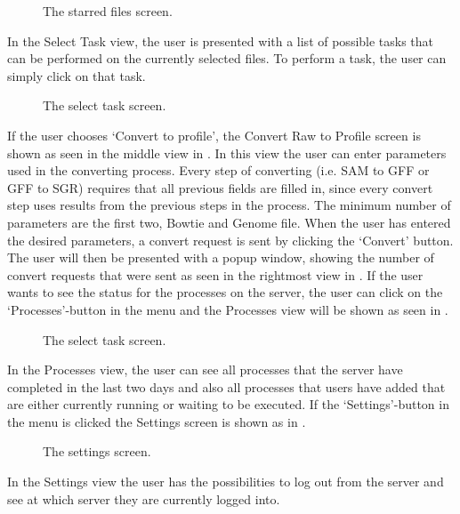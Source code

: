\begin{figure}[htb]
\caption{The starred files screen.}
\label{fig:ios_selectedFiles}
\end{figure}
\FloatBarrier
In the Select Task view, the user is presented with a list of possible tasks that can be performed on the currently selected files. To perform a task, the user can simply click on that task.

\begin{figure}[htb]
\caption{The select task screen.}
\label{fig:ios_convert}
\end{figure}
\FloatBarrier
If the user chooses ‘Convert to profile’, the Convert Raw to Profile screen is shown as seen in the middle view in . In this view the user can enter parameters used in the converting process. Every step of converting (i.e. SAM to GFF or GFF to SGR) requires that all previous fields are filled in, since every convert step uses results from the previous steps in the process. The minimum number of parameters are the first two, Bowtie and Genome file. When the user has entered the desired parameters, a convert request is sent by clicking the ‘Convert’ button. The user will then be presented with a popup window, showing the number of convert requests that were sent as seen in the rightmost view in . If the user wants to see the status for the processes on the server, the user can click on the ‘Processes’-button in the menu and the Processes view will be shown as seen in .
\begin{figure}[htb]
\caption{The select task screen.}
\label{fig:ios_processes}
\end{figure}
\FloatBarrier
In the Processes view, the user can see all processes that the server have completed in the last two days and also all processes that users have added that are either currently running or waiting to be executed.
If the ‘Settings’-button in the menu is clicked the Settings screen is shown as in .  

\begin{figure}[htb]
\caption{The settings screen.}
\label{fig:ios_more}
\end{figure}
\FloatBarrier
In the Settings view the user has the possibilities to log out from the server and see at which server they are currently logged into. 









